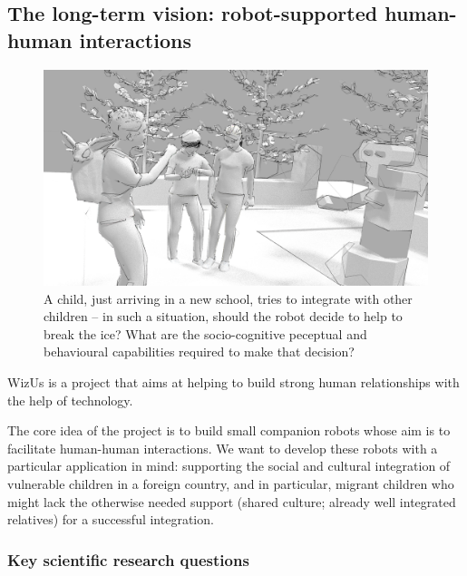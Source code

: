 \documentclass[11pt,a4paper]{report}
\newcommand{\project}{WizUs\xspace}
\begin{document}

\subsection{The long-term vision: robot-supported human-human interactions}


\begin{figure}
\centering
\includegraphics[width=0.9\linewidth]{figs/rHHI-1}
\caption{A child, just arriving in a new school, tries to integrate with other
    children -- in such a situation, should the robot decide to help to break the ice? What
    are the socio-cognitive peceptual and behavioural capabilities required to
    make that decision?}
\label{fig:rHHI}
\end{figure}


\project is a project that aims at helping to build strong human
relationships with the help of technology.

The core idea of the project is to build small companion robots whose
aim is to facilitate human-human interactions. We want to develop these
robots with a particular application in mind: supporting the social and
cultural integration of vulnerable children in a foreign country, and in
particular, migrant children who might lack the otherwise needed support
(shared culture; already well integrated relatives) for a successful
integration.

\subsubsection{Key scientific research questions}
\end{document}

